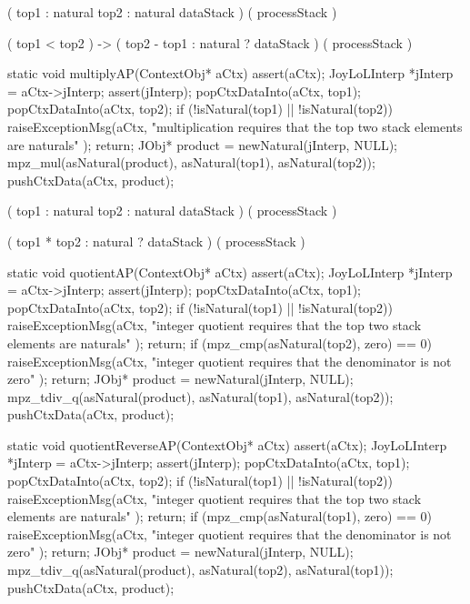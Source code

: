 \startWord[subtractReverse]

\preDataStack
  (
    top1 : natural
    top2 : natural
    dataStack
  )
\preProcessStack
  ( processStack )
\preConditions
\stopPreStack

\postDataStack
  ( top1 < top2 ) -> (
    top2 - top1 : natural ?
    dataStack
  )
\postProcessStack
  ( processStack )
\postConditions
\stopPostStack

\stopWord

\startCCode
static void multiplyAP(ContextObj* aCtx) {
  assert(aCtx);
  JoyLoLInterp *jInterp = aCtx->jInterp;
  assert(jInterp);
  popCtxDataInto(aCtx, top1);
  popCtxDataInto(aCtx, top2);
  if (!isNatural(top1) || !isNatural(top2)) {
    raiseExceptionMsg(aCtx,
      "multiplication requires that the top two stack elements are naturals"
    );
    return;
  }
  JObj* product = newNatural(jInterp, NULL);
  mpz_mul(asNatural(product), asNatural(top1), asNatural(top2));
  pushCtxData(aCtx, product);
}
\stopCCode

\startWord[multiply]

\preDataStack
  (
    top1 : natural
    top2 : natural
    dataStack
  )
\preProcessStack
  ( processStack )
\preConditions
\stopPreStack

\postDataStack
  (
    top1 * top2 : natural ?
    dataStack
  )
\postProcessStack
  ( processStack )
\postConditions
\stopPostStack

\stopWord

\startCCode
static void quotientAP(ContextObj* aCtx) {
  assert(aCtx);
  JoyLoLInterp *jInterp = aCtx->jInterp;
  assert(jInterp);
  popCtxDataInto(aCtx, top1);
  popCtxDataInto(aCtx, top2);
  if (!isNatural(top1) || !isNatural(top2)) {
    raiseExceptionMsg(aCtx,
      "integer quotient requires that the top two stack elements are naturals"
    );
    return;
  }
  if (mpz_cmp(asNatural(top2), zero) == 0) {
    raiseExceptionMsg(aCtx,
      "integer quotient requires that the denominator is not zero"
    );
    return;
  }
  JObj* product = newNatural(jInterp, NULL);
  mpz_tdiv_q(asNatural(product), asNatural(top1), asNatural(top2));
  pushCtxData(aCtx, product);
}

static void quotientReverseAP(ContextObj* aCtx) {
  assert(aCtx);
  JoyLoLInterp *jInterp = aCtx->jInterp;
  assert(jInterp);
  popCtxDataInto(aCtx, top1);
  popCtxDataInto(aCtx, top2);
  if (!isNatural(top1) || !isNatural(top2)) {
    raiseExceptionMsg(aCtx,
      "integer quotient requires that the top two stack elements are naturals"
    );
    return;
  }
  if (mpz_cmp(asNatural(top1), zero) == 0) {
    raiseExceptionMsg(aCtx,
      "integer quotient requires that the denominator is not zero"
    );
    return;
  }
  JObj* product = newNatural(jInterp, NULL);
  mpz_tdiv_q(asNatural(product), asNatural(top2), asNatural(top1));
  pushCtxData(aCtx, product);
}

